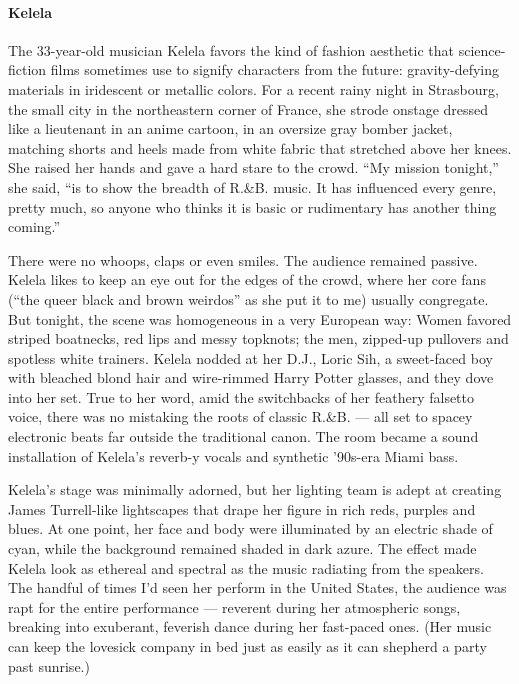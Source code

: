 \hypertarget{kelela}{%
\paragraph{Kelela}\label{kelela}}

The 33-year-old musician Kelela favors the kind of fashion aesthetic
that science-fiction films sometimes use to signify characters from the
future: gravity-defying materials in iridescent or metallic colors. For
a recent rainy night in Strasbourg, the small city in the northeastern
corner of France, she strode onstage dressed like a lieutenant in an
anime cartoon, in an oversize gray bomber jacket, matching shorts and
heels made from white fabric that stretched above her knees. She raised
her hands and gave a hard stare to the crowd. ``My mission tonight,''
she said, ``is to show the breadth of R.\&B. music. It has influenced
every genre, pretty much, so anyone who thinks it is basic or
rudimentary has another thing coming.''

There were no whoops, claps or even smiles. The audience remained
passive. Kelela likes to keep an eye out for the edges of the crowd,
where her core fans (``the queer black and brown weirdos'' as she put it
to me) usually congregate. But tonight, the scene was homogeneous in a
very European way: Women favored striped boatnecks, red lips and messy
topknots; the men, zipped-up pullovers and spotless white trainers.
Kelela nodded at her D.J., Loric Sih, a sweet-faced boy with bleached
blond hair and wire-rimmed Harry Potter glasses, and they dove into her
set. True to her word, amid the switchbacks of her feathery falsetto
voice, there was no mistaking the roots of classic R.\&B. --- all set to
spacey electronic beats far outside the traditional canon. The room
became a sound installation of Kelela's reverb-y vocals and synthetic
'90s-era Miami bass.

Kelela's stage was minimally adorned, but her lighting team is adept at
creating James Turrell-like lightscapes that drape her figure in rich
reds, purples and blues. At one point, her face and body were
illuminated by an electric shade of cyan, while the background remained
shaded in dark azure. The effect made Kelela look as ethereal and
spectral as the music radiating from the speakers. The handful of times
I'd seen her perform in the United States, the audience was rapt for the
entire performance --- reverent during her atmospheric songs, breaking
into exuberant, feverish dance during her fast-paced ones. (Her music
can keep the lovesick company in bed just as easily as it can shepherd a
party past sunrise.)

